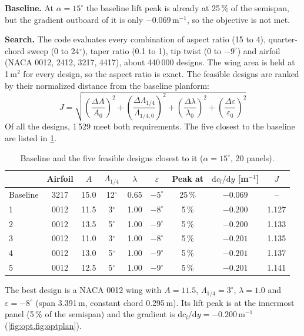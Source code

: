 \documentclass[11pt,letterpaper]{article}
\newcommand{\dd}{\mathrm{d}}
\begin{document}
\textbf{Baseline.} At $\alpha = 15^\circ$ the baseline lift peak is already at 25\,\% of the semispan, but
the gradient outboard of it is only $-0.069$\,m$^{-1}$, so the objective is not met.

\textbf{Search.} The code evaluates every combination of aspect ratio (15 to 4), quarter-chord sweep
(0 to 24$^\circ$), taper ratio (0.1 to 1), tip twist (0 to $-9^\circ$) and airfoil (NACA 0012, 2412,
3217, 4417), about 440\,000 designs. The wing area is held at 1\,m$^2$ for every design, so the aspect
ratio is exact. The feasible designs are ranked by their normalized distance from the baseline
planform:
\begin{equation}
  J = \sqrt{\left(\frac{\Delta A}{A_0}\right)^2 + \left(\frac{\Delta\Lambda_{1/4}}{\Lambda_{1/4,0}}\right)^2
      + \left(\frac{\Delta\lambda}{\lambda_0}\right)^2 + \left(\frac{\Delta\varepsilon}{\varepsilon_0}\right)^2}
\end{equation}
Of all the designs, 1\,529 meet both requirements. The five closest to the baseline are listed in
\cref{tab:opt}.

\begin{table}[H]
  \centering
  \begin{tabular}{lcccccccc}
    \toprule
    & Airfoil & $A$ & $\Lambda_{1/4}$ & $\lambda$ & $\varepsilon$ & Peak at & $\dd c_l/\dd y$ [m$^{-1}$] & $J$ \\
    \midrule
    Baseline & 3217 & 15.0 & 12$^\circ$ & 0.65 & $-5^\circ$ & 25\,\% & $-0.069$ & -- \\
    \midrule
    1 & 0012 & 11.5 & 3$^\circ$ & 1.00 & $-8^\circ$ & 5\,\% & $-0.200$ & 1.127 \\
    2 & 0012 & 13.5 & 5$^\circ$ & 1.00 & $-9^\circ$ & 5\,\% & $-0.200$ & 1.133 \\
    3 & 0012 & 11.0 & 3$^\circ$ & 1.00 & $-8^\circ$ & 5\,\% & $-0.201$ & 1.135 \\
    4 & 0012 & 13.0 & 5$^\circ$ & 1.00 & $-9^\circ$ & 5\,\% & $-0.201$ & 1.137 \\
    5 & 0012 & 12.5 & 5$^\circ$ & 1.00 & $-9^\circ$ & 5\,\% & $-0.201$ & 1.141 \\
    \bottomrule
  \end{tabular}
  \caption{Baseline and the five feasible designs closest to it ($\alpha = 15^\circ$, 20 panels).}
  \label{tab:opt}
\end{table}

The best design is a NACA 0012 wing with $A = 11.5$, $\Lambda_{1/4} = 3^\circ$, $\lambda = 1.0$ and
$\varepsilon = -8^\circ$ (span 3.391\,m, constant chord 0.295\,m). Its lift peak is at the innermost
panel (5\,\% of the semispan) and the gradient is $\dd c_l/\dd y = -0.200$\,m$^{-1}$
(\cref{fig:opt,fig:optplan}).
\end{document}
